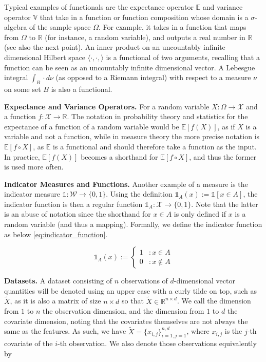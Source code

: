 \documentclass[twoside]{article} \usepackage{aistats2017}
\theoremstyle{definition}
\newcommand{\rv}[1]{{#1}}
\newcommand{\ds}[1]{\tilde{#1}}
\begin{document}
	Typical examples of functionals are the expectance operator $\mathbb{E}$ and variance operator $\mathbb{V}$ that take in a function or function composition whose domain is a $\sigma$-algebra of the sample space $\Omega$. For example, it takes in a function that maps from $\Omega$ to $\mathbb{R}$ (for instance, a random variable), and outputs a real number in $\mathbb{R}$ (see also the next point). An inner product on an uncountably infinite dimensional Hilbert space $\langle \cdot, \cdot, \rangle$ is a functional of two arguments, recalling that a function can be seen as an uncountably infinite dimensional vector. A Lebesgue integral $\int_{B} \cdot d\nu$ (as opposed to a Riemann integral) with respect to a measure $\nu$ on some set $B$ is also a functional.
	
	\textbf{Expectance and Variance Operators.} For a random variable $\rv{X} : \Omega \to \mathcal{X}$ and a function $f : \mathcal{X} \to \mathbb{R}$. The notation in probability theory and statistics for the expectance of a function of a random variable would be $\mathbb{E}[f(\rv{X})]$, as if $\rv{X}$ is a variable and not a function, while in measure theory the more precise notation is $\mathbb{E}[f \circ \rv{X}]$, as $\mathbb{E}$ is a functional and should therefore take a function as the input. In practice, $\mathbb{E}[f(\rv{X})]$ becomes a shorthand for $\mathbb{E}[f \circ \rv{X}]$, and thus the former is used more often.
	
	\textbf{Indicator Measures and Functions.} Another example of a measure is the indicator measure $\mathbb{1} : \mathcal{W} \to \{0, 1\}$. Using the definition $\mathbb{1}_{A}(x) := \mathbb{1}[x \in A]$, the indicator function is then a regular function $\mathbb{1}_{A} : \mathcal{X} \to \{0, 1\}$. Note that the latter is an abuse of notation since the shorthand for $x \in A$ is only defined if $x$ is a random variable (and thus a mapping). Formally, we define the indicator function as below \eqref{eq:indicator_function}.
	
	\begin{equation}
		\mathbb{1}_{A}(x) := \begin{cases}
			1 & : x \in A \\
			0 & : x \notin A
		\end{cases}
	\label{eq:indicator_function}
	\end{equation}
	
	\textbf{Datasets.} A dataset consisting of $n$ observations of $d$-dimensional vector quantities will be denoted using an upper case with a curly tilde on top, such as $\ds{X}$, as it is also a matrix of size $n \times d$ so that $\ds{X} \in \mathbb{R}^{n \times d}$. We call the dimension from $1$ to $n$ the observation dimension, and the dimension from $1$ to $d$ the covariate dimension, noting that the covariates themselves are not always the same as the features. As such, we have $\ds{X} = \{x_{i, j}\}_{i = 1, j = 1}^{n, d}$, where $x_{i, j}$ is the $j$-th covariate of the $i$-th observation. We also denote those observations equivalently by
\end{document}
